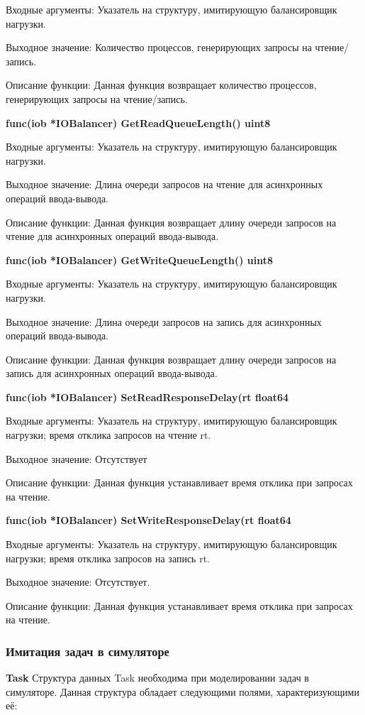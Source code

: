 Входные аргументы: Указатель на структуру, имитирующую балансировщик нагрузки.

Выходное значение: Количество процессов, генерирующих запросы на чтение/запись.

Описание функции: Данная функция возвращает количество процессов, генерирующих запросы на чтение/запись.

\textbf{func(iob *IOBalancer) GetReadQueueLength() uint8}

Входные аргументы: Указатель на структуру, имитирующую балансировщик нагрузки.

Выходное значение: Длина очереди запросов на чтение для асинхронных операций ввода-вывода.

Описание функции: Данная функция возвращает длину очереди запросов на чтение для асинхронных операций ввода-вывода.

\textbf{func(iob *IOBalancer) GetWriteQueueLength() uint8}

Входные аргументы: Указатель на структуру, имитирующую балансировщик нагрузки.

Выходное значение: Длина очереди запросов на запись для асинхронных операций ввода-вывода. 

Описание функции: Данная функция возвращает длину очереди запросов на запись для асинхронных операций ввода-вывода.

\textbf{func(iob *IOBalancer) SetReadResponseDelay(rt float64}

Входные аргументы: Указатель на структуру, имитирующую балансировщик нагрузки; время отклика запросов на чтение rt.

Выходное значение: Отсутствует 

Описание функции: Данная функция устанавливает время отклика при запросах на чтение.

\textbf{func(iob *IOBalancer) SetWriteResponseDelay(rt float64}

Входные аргументы: Указатель на структуру, имитирующую балансировщик нагрузки; время отклика запросов на запись rt.

Выходное значение: Отсутствует.

Описание функции: Данная функция устанавливает время отклика при запросах на чтение.

\subsubsection{Имитация задач в симуляторе}
\textbf{Task}
Структура данных Task необходима при моделировании задач в симуляторе. Данная структура обладает следующими полями, характеризующими  её:

